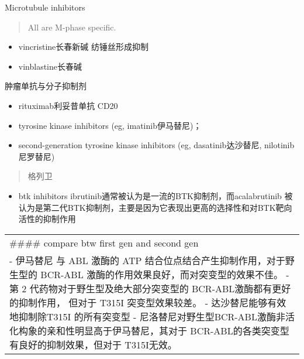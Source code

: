 \documentclass[
  ignorenonframetext,
]{beamer}
\providecommand{\tightlist}{%
  \setlength{\itemsep}{0pt}\setlength{\parskip}{0pt}}
\begin{document}
\begin{frame}
\begin{block}{Microtubule inhibitors}
\protect\hypertarget{microtubule-inhibitors}{}
\begin{quote}
All are M-phase specific.
\end{quote}

\begin{itemize}
\item
  vincristine长春新碱 纺锤丝形成抑制
\item
  vinblastine长春碱
\end{itemize}
\end{block}
\end{frame}

\begin{frame}
\begin{block}{肿瘤单抗与分子抑制剂}
\protect\hypertarget{ux80bfux7624ux5355ux6297ux4e0eux5206ux5b50ux6291ux5236ux5242}{}
\begin{itemize}
\item
  rituximab利妥昔单抗 CD20
\item
  tyrosine kinase inhibitors (eg, imatinib伊马替尼)；
\item
  second-generation tyrosine kinase inhibitors (eg, dasatinib达沙替尼,
  nilotinib尼罗替尼)
\end{itemize}

\begin{quote}
格列卫
\end{quote}

\begin{itemize}
\tightlist
\item
  btk inhibitors ibrutinib通常被认为是一流的BTK抑制剂，而acalabrutinib
  被认为是第二代BTK抑制剂，主要是因为它表现出更高的选择性和对BTK靶向活性的抑制作用
\end{itemize}

\begin{longtable}[]{@{}
  >{\raggedright\arraybackslash}p{}@{}}
\toprule()
\endhead
\#\#\#\# compare btw first gen and second gen \\
- 伊马替尼 与 ABL 激酶的 ATP 结合位点结合产生抑制作用，对于野生型的
BCR-ABL 激酶的作用效果良好，而对突变型的效果不佳。 - 第 2
代药物对于野生型及绝大部分突变型的 BCR-ABL激酶都有更好的抑制作用，
但对于 T315I 突变型效果较差。 - 达沙替尼能够有效地抑制除T315I
的所有突变型 -
尼洛替尼对野生型BCR-ABL激酶非活化构象的亲和性明显高于伊马替尼，其对于
BCR-ABL的各类突变型有良好的抑制效果，但对于 T315I无效。 \\
\bottomrule()
\end{longtable}
\end{block}


\end{frame}
\end{document}
